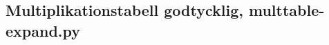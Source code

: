 \begin{frame}
  \inputminted[firstline=13,firstnumber=13]{python}{examples/multtable.py}
\end{frame}

\subsection{Multiplikationstabell godtycklig, multtable-expand.py}

\begin{frame}
  \inputminted[firstline=3,lastline=16,firstnumber=3]{python}{examples/multtable-expand.py}
\end{frame}

\begin{frame}
  \inputminted[firstline=17,firstnumber=17]{python}{examples/multtable-expand.py}
\end{frame}

